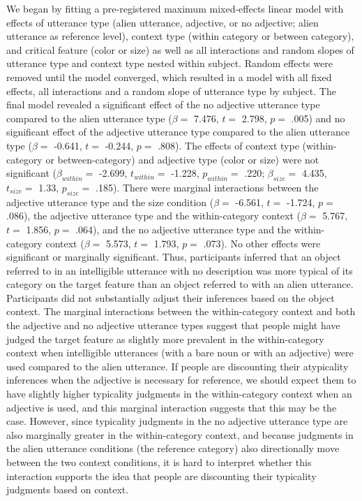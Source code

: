 \documentclass{ucetd}
\begin{document}
We began by fitting a pre-registered maximum mixed-effects linear model
with effects of utterance type (alien utterance, adjective, or no
adjective; alien utterance as reference level), context type (within
category or between category), and critical feature (color or size) as
well as all interactions and random slopes of utterance type and context
type nested within subject. Random effects were removed until the model
converged, which resulted in a model with all fixed effects, all
interactions and a random slope of utterance type by subject. The final
model revealed a significant effect of the no adjective utterance type
compared to the alien utterance type (\(\beta =\) 7.476, \(t =\) 2.798,
\(p =\) .005) and no significant effect of the adjective utterance type
compared to the alien utterance type (\(\beta =\) -0.641, \(t =\)
-0.244, \(p =\) .808). The effects of context type (within-category or
between-category) and adjective type (color or size) were not
significant (\(\beta_{within} =\) -2.699, \(t_{within} =\) -1.228,
\(p_{within} =\) .220; \(\beta_{size} =\) 4.435, \(t_{size} =\) 1.33,
\(p_{size} =\) .185). There were marginal interactions between the
adjective utterance type and the size condition (\(\beta =\) -6.561,
\(t =\) -1.724, \(p =\) .086), the adjective utterance type and the
within-category context (\(\beta =\) 5.767, \(t =\) 1.856, \(p =\)
.064), and the no adjective utterance type and the within-category
context (\(\beta =\) 5.573, \(t =\) 1.793, \(p =\) .073). No other
effects were significant or marginally significant. Thus, participants
inferred that an object referred to in an intelligible utterance with no
description was more typical of its category on the target feature than
an object referred to with an alien utterance. Participants did not
substantially adjust their inferences based on the object context. The
marginal interactions between the within-category context and both the
adjective and no adjective utterance types suggest that people might
have judged the target feature as slightly more prevalent in the
within-category context when intelligible utterances (with a bare noun
or with an adjective) were used compared to the alien utterance. If
people are discounting their atypicality inferences when the adjective
is necessary for reference, we should expect them to have slightly
higher typicality judgments in the within-category context when an
adjective is used, and this marginal interaction suggests that this may
be the case. However, since typicality judgments in the no adjective
utterance type are also marginally greater in the within-category
context, and because judgments in the alien utterance conditions (the
reference category) also directionally move between the two context
conditions, it is hard to interpret whether this interaction supports
the idea that people are discounting their typicality judgments based on
context.
\end{document}
